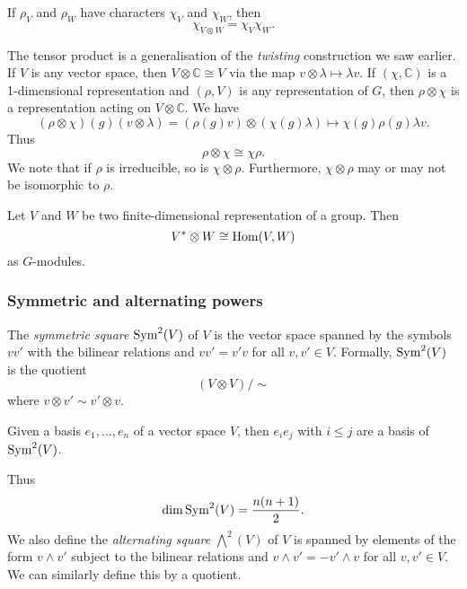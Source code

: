 \begin{proposition}
    If $\rho_V$ and $\rho_W$ have characters $\chi_V$ and $\chi_W$, then
    \[ \chi_{V \otimes W} = \chi_V \chi_W. \]
\end{proposition}

The tensor product is a generalisation of the \emph{twisting} construction we saw earlier. If $V$ is any vector space, then $V \otimes \mathbb C \cong V$ via the map $v \otimes \lambda \mapsto \lambda v$. If $(\chi, \mathbb C)$ is a 1-dimensional representation and $(\rho, V)$ is any representation of $G$, then $\rho \otimes \chi$ is a representation acting on $V \otimes \mathbb C$. We have
\[ (\rho \otimes \chi)(g)(v \otimes \lambda) = (\rho(g)v) \otimes (\chi(g)\lambda) \mapsto \chi(g) \rho(g) \lambda v. \]
Thus
\[ \rho \otimes \chi \cong \chi\rho. \]
We note that if $\rho$ is irreducible, so is $\chi \otimes \rho$. Furthermore, $\chi \otimes \rho$ may or may not be isomorphic to $\rho$. 

\begin{lemma}
    Let $V$ and $W$ be two finite-dimensional representation of a group. Then
    \[ V^* \otimes W \cong \operatorname{Hom}(V, W) \]
    as $G$-modules. 
\end{lemma}

\subsubsection{Symmetric and alternating powers}

The \emph{symmetric square} $\operatorname{Sym}^2(V)$ of $V$ is the vector space spanned by the symbols $vv'$ with the bilinear relations and $vv' = v'v$ for all $v,v' \in V$. Formally, $\operatorname{Sym}^2(V)$ is the quotient
\[ (V \otimes V)/{\sim} \]
where $v \otimes v' \sim v' \otimes v$. 

\begin{proposition}
    Given a basis $e_1, \ldots, e_n$ of a vector space $V$, then $e_i e_j$ with $i \leq  j$ are a basis of $\operatorname{Sym}^2(V)$.
\end{proposition}

Thus
\[ \dim \operatorname{Sym}^2(V) = \frac{n(n+1)}2. \]
We also define the \emph{alternating square} ${\bigwedge}^2(V)$ of $V$ is spanned by elements of the form $v \wedge v'$ subject to the bilinear relations and $v \wedge v' = -v' \wedge v$ for all $v, v' \in V$. We can similarly define this by a quotient.

